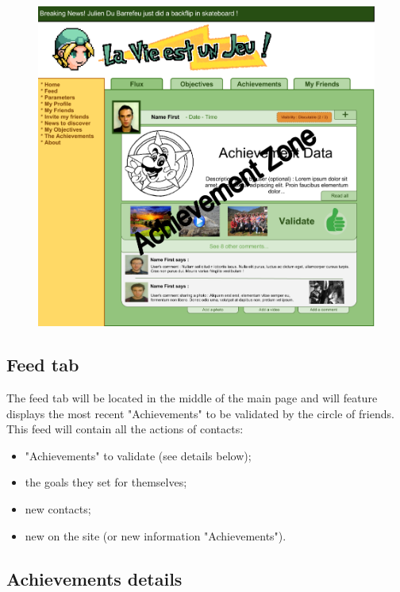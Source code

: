 \documentclass{life-fr}
\begin{document}
\begin{figure}[H]
  \begin{center}
    \includegraphics[width=15cm]{img/accueil.png}
  \end{center}
\end{figure}


\subsection{Feed tab}

The feed tab will be located in the middle of the main page and will feature displays the most recent "Achievements" to be validated by the circle of friends.\\

This feed will contain all the actions of contacts:

\begin{itemize}
  \item "Achievements" to validate (see details below);
  \item the goals they set for themselves;
  \item new contacts;
  \item new on the site (or new information "Achievements").
\end{itemize}

\newpage

\subsection{Achievements details}
\end{document}

